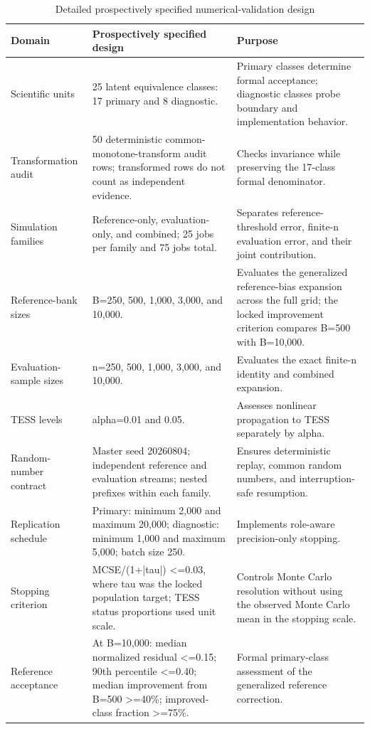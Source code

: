 \begin{table}[htbp]
\centering
\caption{Detailed prospectively specified numerical-validation design}
\label{tab:validation-design-detailed}
\begin{tabularx}{\textwidth}{p{} X X}
\toprule
Domain & Prospectively specified design & Purpose \\
\midrule
Scientific units & 25 latent equivalence classes: 17 primary and 8 diagnostic. & Primary classes determine formal acceptance; diagnostic classes probe boundary and implementation behavior. \\
Transformation audit & 50 deterministic common-monotone-transform audit rows; transformed rows do not count as independent evidence. & Checks invariance while preserving the 17-class formal denominator. \\
Simulation families & Reference-only, evaluation-only, and combined; 25 jobs per family and 75 jobs total. & Separates reference-threshold error, finite-n evaluation error, and their joint contribution. \\
Reference-bank sizes & B=250, 500, 1,000, 3,000, and 10,000. & Evaluates the generalized reference-bias expansion across the full grid; the locked improvement criterion compares B=500 with B=10,000. \\
Evaluation-sample sizes & n=250, 500, 1,000, 3,000, and 10,000. & Evaluates the exact finite-n identity and combined expansion. \\
TESS levels & alpha=0.01 and 0.05. & Assesses nonlinear propagation to TESS separately by alpha. \\
Random-number contract & Master seed 20260804; independent reference and evaluation streams; nested prefixes within each family. & Ensures deterministic replay, common random numbers, and interruption-safe resumption. \\
Replication schedule & Primary: minimum 2,000 and maximum 20,000; diagnostic: minimum 1,000 and maximum 5,000; batch size 250. & Implements role-aware precision-only stopping. \\
Stopping criterion & MCSE/(1+|tau|) <=0.03, where tau was the locked population target; TESS status proportions used unit scale. & Controls Monte Carlo resolution without using the observed Monte Carlo mean in the stopping scale. \\
Reference acceptance & At B=10,000: median normalized residual <=0.15; 90th percentile <=0.40; median improvement from B=500 >=40\%; improved-class fraction >=75\%. & Formal primary-class assessment of the generalized reference correction. \\

\end{tabularx}
\end{table}
